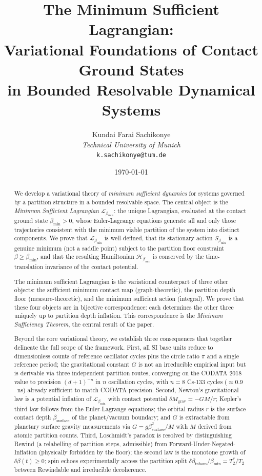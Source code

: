 \documentclass[12pt, a4paper]{article}
\title{\textbf{The Minimum Sufficient Lagrangian:\\
Variational Foundations of Contact Ground States\\
in Bounded Resolvable Dynamical Systems}}
\author{Kundai Farai Sachikonye\\
\textit{Technical University of Munich}\\
\texttt{k.sachikonye@tum.de}}
\date{\today}
\theoremstyle{plain}
\theoremstyle{definition}
\theoremstyle{remark}
\newcommand{\bmin}{\beta_{\min}}
\newcommand{\Lmin}{\mathcal{L}_{\bmin}}
\newcommand{\Smin}{S_{\bmin}}
\newcommand{\Hmin}{\mathcal{H}_{\bmin}}
\begin{document}
\maketitle

\begin{abstract}

We develop a variational theory of \emph{minimum sufficient dynamics} for
systems governed by a partition structure in a bounded resolvable space. The
central object is the \emph{Minimum Sufficient Lagrangian} $\Lmin$: the unique
Lagrangian, evaluated at the contact ground state $\bmin > 0$, whose
Euler-Lagrange equations generate all and only those trajectories consistent with
the minimum viable partition of the system into distinct components. We prove
that $\Lmin$ is well-defined, that its stationary action $\Smin$ is a genuine
minimum (not a saddle point) subject to the partition floor constraint
$\beta \geq \bmin$, and that the resulting Hamiltonian $\Hmin$ is conserved
by the time-translation invariance of the contact potential.

The minimum sufficient Lagrangian is the variational counterpart of three other
objects: the sufficient minimum contact map (graph-theoretic), the partition
depth floor (measure-theoretic), and the minimum sufficient action (integral).
We prove that these four objects are in bijective correspondence: each
determines the other three uniquely up to partition depth inflation. This
correspondence is the \emph{Minimum Sufficiency Theorem}, the central result of
the paper.

Beyond the core variational theory, we establish three consequences that together
delineate the full scope of the framework. First, all SI base units reduce to
dimensionless counts of reference oscillator cycles plus the circle ratio $\pi$
and a single reference period; the gravitational constant $G$ is not an
irreducible empirical input but is derivable via three independent partition
routes, converging on the CODATA 2018 value to precision $(d+1)^{-n}$ in $n$
oscillation cycles, with $n = 8$ Cs-133 cycles ($\approx 0.9$~ns) already
sufficient to match CODATA precision. Second, Newton's gravitational law is a
potential inflation of $\Lmin$ with contact potential $\delta M_{\mathrm{grav}}
= -GM/r$; Kepler's third law follows from the Euler-Lagrange equations; the
orbital radius $r$ is the surface contact depth $\beta_{\mathrm{surface}}$ of
the planet/vacuum boundary; and $G$ is extractable from planetary surface
gravity measurements via $G = g\beta_{\mathrm{surface}}^2/M$ with $M$ derived
from atomic partition counts. Third, Loschmidt's paradox is resolved by
distinguishing Rewind (a relabelling of partition steps, admissible) from
Forward-Under-Negated-Inflation (physically forbidden by the floor); the second
law is the monotone growth of $\delta\beta(t) \geq 0$; spin echoes
experimentally access the partition split $\delta\beta_{\mathrm{inhom}}/\bmin =
T_2^*/T_2$ between Rewindable and irreducible decoherence.


\end{abstract}
\end{document}
